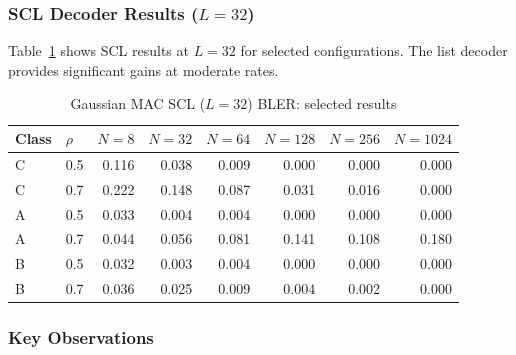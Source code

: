 \documentclass[11pt,a4paper]{article}
\begin{document}
\subsubsection{SCL Decoder Results ($L = 32$)}

Table~\ref{tab:gmac_scl} shows SCL results at $L = 32$ for selected
configurations. The list decoder provides significant gains at moderate
rates.

\begin{table}[h]
\centering
\caption{Gaussian MAC SCL ($L = 32$) BLER: selected results}
\label{tab:gmac_scl}
\begin{tabular}{llrrrrrr}
\toprule
\textbf{Class} & $\rho$ & $N = 8$ & $N = 32$ & $N = 64$ & $N = 128$ & $N = 256$ & $N = 1024$ \\
\midrule
C & 0.5 & 0.116 & 0.038 & 0.009 & 0.000 & 0.000 & 0.000 \\
C & 0.7 & 0.222 & 0.148 & 0.087 & 0.031 & 0.016 & 0.000 \\
A & 0.5 & 0.033 & 0.004 & 0.004 & 0.000 & 0.000 & 0.000 \\
A & 0.7 & 0.044 & 0.056 & 0.081 & 0.141 & 0.108 & 0.180 \\
B & 0.5 & 0.032 & 0.003 & 0.004 & 0.000 & 0.000 & 0.000 \\
B & 0.7 & 0.036 & 0.025 & 0.009 & 0.004 & 0.002 & 0.000 \\
\bottomrule
\end{tabular}
\end{table}

\subsubsection{Key Observations}
\end{document}
